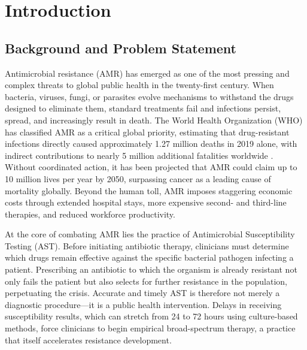 \chapter{Introduction}

\section{Background and Problem Statement}

Antimicrobial resistance (AMR) has emerged as one of the most pressing and complex threats to global
public health in the twenty-first century. When bacteria, viruses, fungi, or parasites evolve mechanisms
to withstand the drugs designed to eliminate them, standard treatments fail and infections persist,
spread, and increasingly result in death. The World Health Organization (WHO) has classified AMR as a
critical global priority, estimating that drug-resistant infections directly caused approximately
1.27 million deaths in 2019 alone, with indirect contributions to nearly 5 million additional
fatalities worldwide \cite{who_amr2022}. Without coordinated action, it has been projected that
AMR could claim up to 10 million lives per year by 2050, surpassing cancer as a leading cause of
mortality globally. Beyond the human toll, AMR imposes staggering economic costs through extended
hospital stays, more expensive second- and third-line therapies, and reduced workforce productivity.

At the core of combating AMR lies the practice of Antimicrobial Susceptibility Testing (AST).
Before initiating antibiotic therapy, clinicians must determine which drugs remain effective against
the specific bacterial pathogen infecting a patient. Prescribing an antibiotic to which the organism
is already resistant not only fails the patient but also selects for further resistance in the
population, perpetuating the crisis. Accurate and timely AST is therefore not merely a diagnostic
procedure---it is a public health intervention. Delays in receiving susceptibility results, which
can stretch from 24 to 72 hours using culture-based methods, force clinicians to begin empirical
broad-spectrum therapy, a practice that itself accelerates resistance development.

